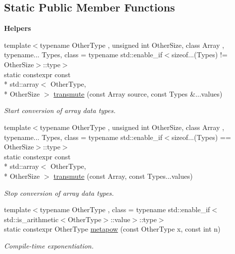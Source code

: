 \subsection*{Static Public Member Functions}
\begin{Indent}{\bf Helpers}\par
\begin{DoxyCompactItemize}
\item 
{\footnotesize template$<$typename Other\-Type , unsigned int Other\-Size, class Array , typename... Types, class  = typename std\-::enable\-\_\-if$<$sizeof...(\-Types) != Other\-Size$>$\-::type$>$ }\\static constexpr const \\*
std\-::array$<$ Other\-Type, \\*
Other\-Size $>$ \hyperlink{exceptionmagrathea_1_1Constant_a4f15a8e1b64bb5f231cc4468cb1b42c3}{transmute} (const Array source, const Types \&...values)
\begin{DoxyCompactList}\small\item\em Start conversion of array data types. \end{DoxyCompactList}\item 
{\footnotesize template$<$typename Other\-Type , unsigned int Other\-Size, class Array , typename... Types, class  = typename std\-::enable\-\_\-if$<$sizeof...(\-Types) == Other\-Size$>$\-::type$>$ }\\static constexpr const \\*
std\-::array$<$ Other\-Type, \\*
Other\-Size $>$ \hyperlink{exceptionmagrathea_1_1Constant_ab139a1bbf12fe25aac8268c49fdc874b}{transmute} (const Array, const Types...\-values)
\begin{DoxyCompactList}\small\item\em Stop conversion of array data types. \end{DoxyCompactList}\item 
{\footnotesize template$<$typename Other\-Type , class  = typename std\-::enable\-\_\-if$<$std\-::is\-\_\-arithmetic$<$\-Other\-Type$>$\-::value$>$\-::type$>$ }\\static constexpr Other\-Type \hyperlink{exceptionmagrathea_1_1Constant_a3b2b451665cc7a88ffd6722cf27a9959}{metapow} (const Other\-Type x, const int n)
\begin{DoxyCompactList}\small\item\em Compile-\/time exponentiation. \end{DoxyCompactList}\item 

\end{DoxyCompactItemize}
\end{Indent}
